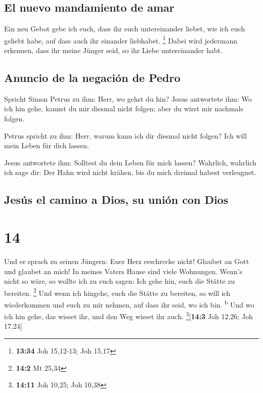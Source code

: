 \hypertarget{el-nuevo-mandamiento-de-amar}{%
\subsection{El nuevo mandamiento de
amar}\label{el-nuevo-mandamiento-de-amar}}

 Ein neu Gebot gebe ich euch, dass ihr euch untereinander
liebet, wie ich euch geliebt habe, auf dass auch ihr einander liebhabet.
\footnote{\textbf{13:34} Joh 15,12-13; Joh 15,17}  Dabei
wird jedermann erkennen, dass ihr meine Jünger seid, so ihr Liebe
untereinander habt.

\hypertarget{anuncio-de-la-negaciuxf3n-de-pedro}{%
\subsection{Anuncio de la negación de
Pedro}\label{anuncio-de-la-negaciuxf3n-de-pedro}}

 Spricht Simon Petrus zu ihm: Herr, wo gehst du hin?
Jesus antwortete ihm: Wo ich hin gehe, kannst du mir diesmal nicht
folgen; aber du wirst mir nachmals folgen.

 Petrus spricht zu ihm: Herr, warum kann ich dir diesmal
nicht folgen? Ich will mein Leben für dich lassen.

 Jesus antwortete ihm: Solltest du dein Leben für mich
lassen? Wahrlich, wahrlich ich sage dir: Der Hahn wird nicht krähen, bis
du mich dreimal habest verleugnet.

\hypertarget{jesuxfas-el-camino-a-dios-su-uniuxf3n-con-dios}{%
\subsection{Jesús el camino a Dios, su unión con
Dios}\label{jesuxfas-el-camino-a-dios-su-uniuxf3n-con-dios}}

\hypertarget{section-13}{%
\section{14}\label{section-13}}

 Und er sprach zu seinen Jüngern: Euer Herz erschrecke
nicht! Glaubet an Gott und glaubet an mich!  In meines
Vaters Hause sind viele Wohnungen. Wenn's nicht so wäre, so wollte ich
zu euch sagen: Ich gehe hin, euch die Stätte zu bereiten. \footnote{\textbf{14:2}
  Mt 25,34}  Und wenn ich hingehe, euch die Stätte zu
bereiten, so will ich wiederkommen und euch zu mir nehmen, auf dass ihr
seid, wo ich bin. \textsuperscript{b}  Und wo ich hin
gehe, das wisset ihr, und den Weg wisset ihr auch.
\footnote{\textbf{14:11} Joh 10,25; Joh 10,38}{[}\textbf{14:3} Joh
12,26; Joh 17,24{]}

